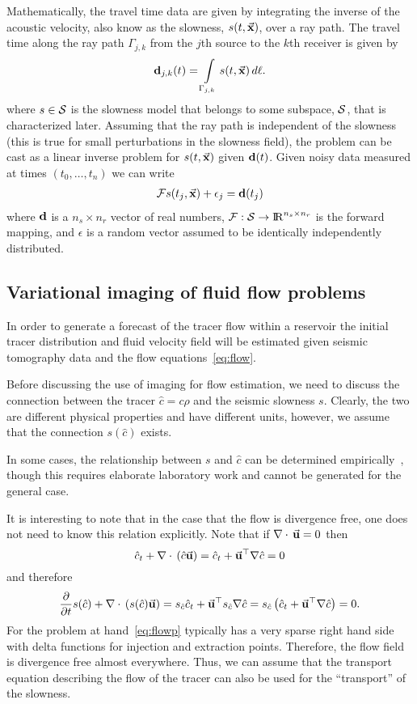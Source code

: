 \documentclass[english]{siamltex}
\newcommand {\R}    {{\rm I\!R}}
\newcommand {\bfd}   { {\bf d} }
\newcommand {\vu}  { {\vec {\bf  u}} }   %
\newcommand {\vx}    {\vec {\bf x}}
\renewcommand{\div}{\nabla\cdot\,}
\renewcommand{\grad}{\ensuremath {{\bf{ \nabla}}}}
\newcommand{\CF}  {\mathcal{F}}    %
\begin{document}
Mathematically, the travel time data are given by integrating the inverse of the acoustic velocity, also know as the slowness, $s(t,\vx)$, over a ray path.
The travel time along the ray path $\Gamma_{j,k}$ from the $j$th source to the $k$th receiver is  given by 
\begin{equation}\label{eq:tomo}
\bfd_{j,k}(t) =  \int\limits_{\Gamma_{j,k}} s(t,\vx)\, d\ell.
\end{equation}
where $s \in {\cal S}$ is the slowness model that belongs to some subspace, ${\cal S}$, that is characterized later.
Assuming that the ray path is independent of the slowness (this is true for small perturbations
in the slowness field), the problem can be cast as a linear inverse problem for $s(t,\vx)$ given $\bfd(t)$.
Given noisy data measured at times $(t_{0},\ldots,t_{n})$  we
can write 
\begin{eqnarray}
\label{eq:forim}
\CF s(t_{j},\vx) + \epsilon_{j}  = \bfd(t_{j})
\end{eqnarray}
where $\bfd$ is a  ${n_s \times n_r}$ vector of real numbers,  $\CF:{\cal S} \rightarrow \R^{n_s \times n_r}$ is the forward mapping,  and $\epsilon$ is
a random vector assumed to be identically independently distributed. 

\subsection{Variational imaging of fluid flow problems} 
\label{sub:derivingTheObjectiveFunctional}

In order to generate a  forecast of the tracer flow within a reservoir the initial tracer distribution and fluid velocity field 
will be estimated given seismic tomography data and the flow equations~\eqref{eq:flow}.


Before discussing the use of imaging for flow estimation, we need to discuss the
connection between the tracer $\hat c = c \rho$ and the seismic slowness $s$.
Clearly, the two are different physical properties and have different units, however,
we assume that the connection $s(\hat c)$ exists.

In some cases, the relationship between $s$ and $\hat c$ can be determined empirically~\cite{GosselinEtAl},
though this requires  elaborate laboratory work and cannot be generated for the general case.

It is interesting to note that in the case that the flow is divergence free,
one does not need to know this relation explicitly. Note that if $\div \vu = 0$ then
$$\hat c_{t} + \div (\hat c \vu)  = \hat c _{t} + \vu^{\top} \grad \hat c = 0 $$ 
and therefore
$$ \frac{\partial}{\partial t}s(\hat c ) + \div (s(\hat c) \vu) 
= s_{ \hat c} \hat c _{t} +  \vu^{\top} s_{ \hat c} \grad \hat c
= s_{ \hat c} \left(\hat c _{t} + \vu^{\top} \grad \hat c \right) = 0. $$
For the problem at hand~\eqref{eq:flowp} typically has a very sparse right hand side with delta functions for injection and extraction points. Therefore, the flow field is divergence
free almost everywhere.
Thus, we can assume that the transport equation describing the flow of the tracer can also be used for the ``transport'' of the slowness.
\end{document}
